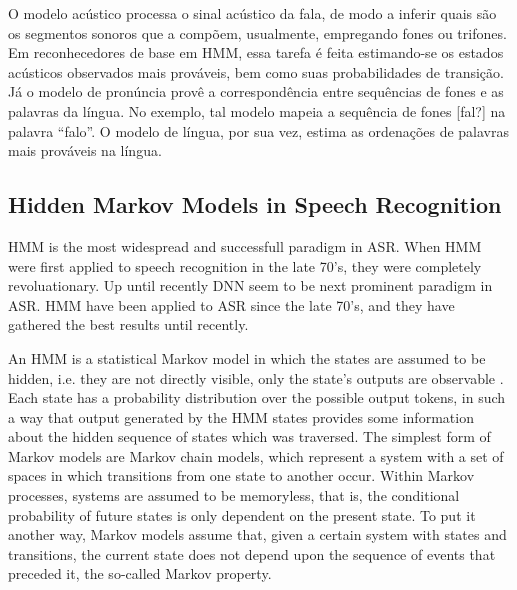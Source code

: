 O modelo ac\'ustico processa o sinal ac\'ustico da fala, de modo a inferir
quais s\~ao os segmentos sonoros que a comp\~oem, usualmente, empregando
fones ou trifones. Em reconhecedores de base em HMM, essa tarefa \'e feita
estimando-se os estados ac\'usticos observados mais prov\'aveis, bem como
suas probabilidades de transi\c{c}\~ao. J\'a o modelo de pron\'uncia prov\^e a
correspond\^encia entre sequ\^encias de fones e as palavras da l\'ingua. No
exemplo, tal modelo mapeia a sequ\^encia de fones {[}fal?{]} na palavra
``falo''. O modelo de l\'ingua, por sua vez, estima as ordena\c{c}\~oes de
palavras mais prov\'aveis na l\'ingua.

\subsection{Hidden Markov Models in Speech Recognition}

\ac{HMM} is the most widespread and successfull paradigm in \ac{ASR}. When \ac{HMM} were first applied
to speech recognition in the late 70's, they were completely revoluationary.
Up until recently \ac{DNN} seem to be next prominent paradigm in \ac{ASR}.
\ac{HMM} have been applied
to \ac{ASR} since the late 70's, and they have gathered the best results until recently.

An \ac{HMM} is a statistical Markov model in which the states are assumed to be hidden, i.e. they are
not directly visible, only the state's outputs are observable \cite{Fink2014}. Each state has a probability distribution over the possible output tokens, in such a way that output generated by the HMM states provides some information about the hidden sequence of states which was traversed.  The simplest form of Markov models are Markov chain models, 
which represent a system with a set of spaces in which transitions from one state to another occur. 
Within Markov processes, systems are assumed to be memoryless, that is, the conditional probability
of future states is only dependent on the present state. To put it another way, Markov models assume that,
given a certain system with states and transitions, the current state does not depend upon the 
sequence of events that preceded it, the so-called Markov property. 

